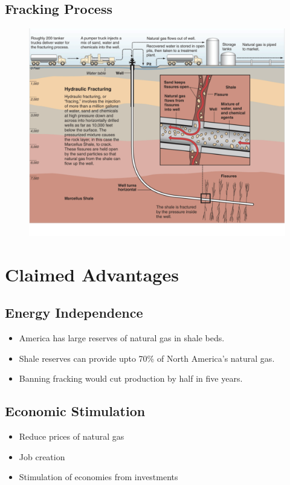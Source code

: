 \documentclass[pdf]{beamer}
\begin{document}
	\subsection{Fracking Process}\begin{frame}
		\begin{figure}
			\includegraphics[scale=0.25]{process.pdf}
		\end{figure}
	\end{frame}
	
\section{Claimed Advantages}

	\subsection{Energy Independence}\begin{frame}\begin{itemize}
		\item America has large reserves of natural gas in shale beds.
		\item Shale reserves can provide upto 70\% of North America's natural gas.
		\item Banning fracking would cut production by half in five years.
	\end{itemize}\end{frame}
	
	\subsection{Economic Stimulation}\begin{frame}\begin{itemize}
		\item Reduce prices of natural gas
		\item Job creation
		\item Stimulation of economies from investments
	\end{itemize}\end{frame}
\end{document}
